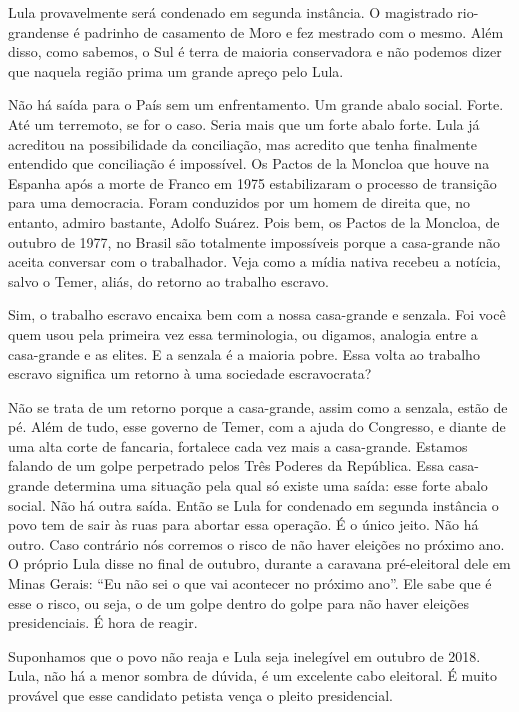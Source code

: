 \falaG Lula provavelmente será condenado em segunda instância. O magistrado
rio-grandense é padrinho de casamento de Moro e fez mestrado com o
mesmo. Além disso, como sabemos, o Sul é terra de maioria conservadora e
não podemos dizer que naquela região prima um grande apreço pelo Lula.

\falaM Não há saída para o País sem um enfrentamento. Um grande abalo
social. Forte. Até um terremoto, se for o caso. Seria mais que um forte
abalo forte. Lula já acreditou na possibilidade da conciliação, mas
acredito que tenha finalmente entendido que conciliação é impossível. Os
Pactos de la Moncloa que houve na Espanha após a morte de Franco em 1975
estabilizaram o processo de transição para uma democracia. Foram
conduzidos por um homem de direita que, no entanto, admiro bastante,
Adolfo Suárez. Pois bem, os Pactos de la Moncloa, de outubro de 1977, no
Brasil são totalmente impossíveis porque a casa-grande não aceita
conversar com o trabalhador. Veja como a mídia nativa recebeu a notícia,
salvo o Temer, aliás, do retorno ao trabalho escravo.

\falaG Sim, o trabalho escravo encaixa bem com a nossa casa-grande e
senzala. Foi você quem usou pela primeira vez essa terminologia, ou
digamos, analogia entre a casa-grande e as elites. E a senzala é a
maioria pobre. Essa volta ao trabalho escravo significa um retorno à uma
sociedade escravocrata?

\falaM Não se trata de um retorno porque a casa-grande, assim como a
senzala, estão de pé. Além de tudo, esse governo de Temer, com a ajuda
do Congresso, e diante de uma alta corte de fancaria, fortalece cada vez
mais a casa-grande. Estamos falando de um golpe perpetrado pelos Três
Poderes da República. Essa casa-grande determina uma situação pela qual
só existe uma saída: esse forte abalo social. Não há outra saída. Então
se Lula for condenado em segunda instância o povo tem de sair às ruas
para abortar essa operação. É o único jeito. Não há outro. Caso
contrário nós corremos o risco de não haver eleições no próximo ano. O
próprio Lula disse no final de outubro, durante a caravana pré-eleitoral
dele em Minas Gerais: ``Eu não sei o que vai acontecer no próximo ano''.
Ele sabe que é esse o risco, ou seja, o de um golpe dentro do golpe para
não haver eleições presidenciais. É hora de reagir.

\falaG Suponhamos que o povo não reaja e Lula seja inelegível em outubro de
2018. Lula, não há a menor sombra de dúvida, é um excelente cabo
eleitoral. É muito provável que esse candidato petista vença o pleito
presidencial.

